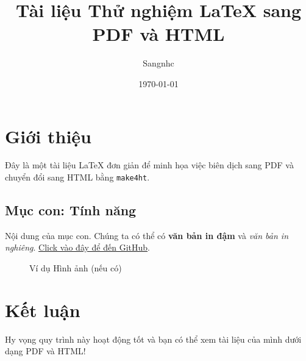 \documentclass{article}
\title{Tài liệu Thử nghiệm LaTeX sang PDF và HTML}
\author{Sangnhc}
\date{\today}
\begin{document}
\maketitle 


\section{Giới thiệu}
Đây là một tài liệu LaTeX đơn giản để minh họa việc biên dịch sang PDF và chuyển đổi sang HTML bằng \texttt{make4ht}.

\subsection{Mục con: Tính năng}
Nội dung của mục con. Chúng ta có thể có \textbf{văn bản in đậm} và \textit{văn bản in nghiêng}.
\href{https://github.com}{Click vào đây để đến GitHub}.

\begin{figure}[H]
    \centering
    \caption{Ví dụ Hình ảnh (nếu có)}
    \label{fig:example}
\end{figure}

\section{Kết luận}
Hy vọng quy trình này hoạt động tốt và bạn có thể xem tài liệu của mình dưới dạng PDF và HTML!
\end{document}
